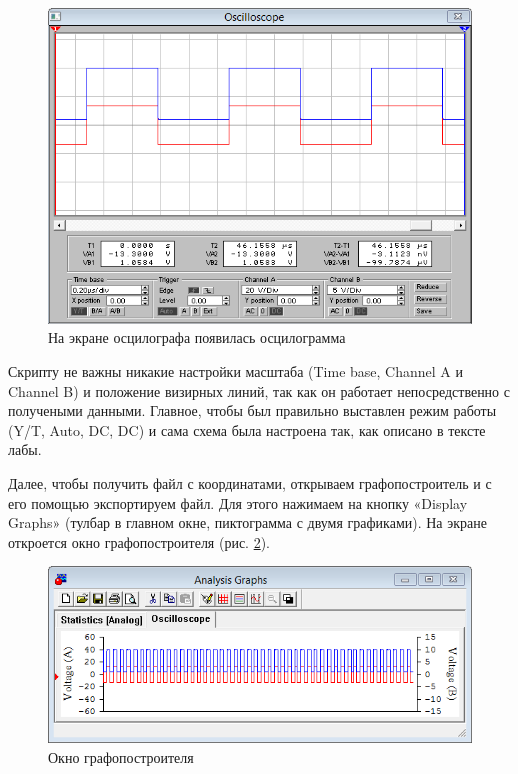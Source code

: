 \documentclass[a4paper,oneside,DIV=10,12pt]{scrartcl}
\begin{document}
		\begin{figure}[H]
			\centering
			\includegraphics[width=\textwidth]{step01.png}
			\caption{На экране осцилографа появилась осцилограмма}
			\label{fig:oscilloscope} 
		\end{figure}
	
		Скрипту не важны никакие настройки масштаба (Time base, Channel A и Channel B) и положение визирных линий, так как он работает непосредственно с получеными данными. Главное, чтобы был правильно выставлен режим работы (Y/T, Auto, DC, DC) и сама схема была настроена так, как описано в тексте лабы.
		
		Далее, чтобы получить файл с координатами, открываем графопостроитель и с его помощью экспортируем файл. Для этого нажимаем на кнопку «Display Graphs» (тулбар в главном окне, пиктограмма с двумя графиками). На экране откроется окно графопостроителя (рис. \ref{fig:grapher}).
		
		\begin{figure}[H]
			\centering
			\includegraphics[width=\textwidth]{step02-1.png}
			\caption{Окно графопостроителя}
			\label{fig:grapher} 
		\end{figure}
		
\end{document}
